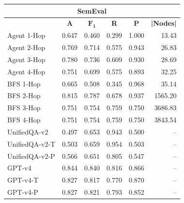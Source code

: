 \begin{table}
\begin{tabular}{@{}lccccr@{}}
  \toprule
  \multicolumn{6}{c}{\textbf{SemEval}}\\
  \midrule
  & \textbf{A} & \textbf{$\mathbf{F_1}$} & \textbf{R} & \textbf{P} & \textbf{|Nodes|}\\
  \midrule
  Agent 1-Hop    & 0.647 & 0.460 & 0.299 & 1.000 & 13.43 \\
  Agent 2-Hop    & 0.769 & 0.714 & 0.575 & 0.943 & 26.83 \\
  Agent 3-Hop    & 0.780 & 0.736 & 0.609 & 0.930 & 28.69 \\
  Agent 4-Hop    & 0.751 & 0.699 & 0.575 & 0.893 & 32.25 \\ 
  \midrule  
  BFS 1-Hop      & 0.665 & 0.508 & 0.345 & 0.968 &   35.14 \\
  BFS 2-Hop      & 0.815 & 0.787 & 0.678 & 0.937 & 1565.20 \\
  BFS 3-Hop      & 0.751 & 0.754 & 0.759 & 0.750 & 3686.83 \\
  BFS 4-Hop      & 0.751 & 0.754 & 0.759 & 0.750 & 3843.54 \\
  \midrule
  UnifiedQA-v2   & 0.497 & 0.653 & 0.943 & 0.500 & -- \\
  UnifiedQA-v2-T & 0.503 & 0.659 & 0.954 & 0.503 & -- \\
  UnifiedQA-v2-P & 0.566 & 0.651 & 0.805 & 0.547 & -- \\
  GPT-v4         & 0.844 & 0.840 & 0.816 & 0.866 & -- \\
  GPT-v4-T       & 0.827 & 0.817 & 0.770 & 0.870 & -- \\
  GPT-v4-P       & 0.827 & 0.821 & 0.793 & 0.852 & -- \\
  \bottomrule
\end{tabular}
\end{table}
